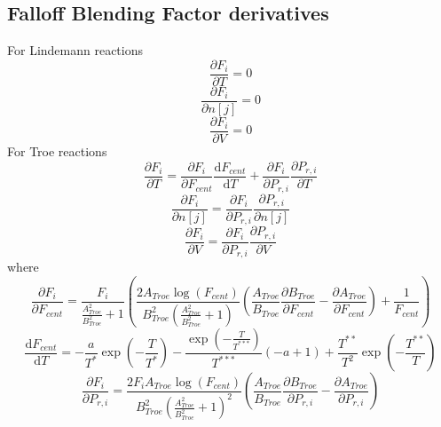 \documentclass[a4paper,10pt]{article}
\begin{document}
\subsection{Falloff Blending Factor derivatives}

 For Lindemann reactions
\begin{dmath} \frac{\partial F_{i} }{\partial T } = 0\end{dmath} 
\begin{dmath} \frac{\partial F_{i} }{\partial n[j] } = 0\end{dmath} 
\begin{dmath} \frac{\partial F_{i} }{\partial V } = 0\end{dmath} 
For Troe reactions
\begin{dmath} \frac{\partial F_{i} }{\partial T } = \frac{\partial F_{i} }{\partial F_{cent} } \frac{\text{d} F_{cent} }{\text{d} T } + \frac{\partial F_{i} }{\partial P_{r, i} } \frac{\partial P_{r, i} }{\partial T }\end{dmath} 
\begin{dmath} \frac{\partial F_{i} }{\partial n[j] } = \frac{\partial F_{i} }{\partial P_{r, i} } \frac{\partial P_{r, i} }{\partial n[j] }\end{dmath} 
\begin{dmath} \frac{\partial F_{i} }{\partial V } = \frac{\partial F_{i} }{\partial P_{r, i} } \frac{\partial P_{r, i} }{\partial V }\end{dmath} 
where
\begin{dmath} \frac{\partial F_{i} }{\partial F_{cent} } = \frac{F_{i}}{\frac{A_{Troe}^{2}}{B_{Troe}^{2}} + 1} \left(\frac{2 A_{Troe} \log{\left (F_{cent} \right )}}{B_{Troe}^{2} \left(\frac{A_{Troe}^{2}}{B_{Troe}^{2}} + 1\right)} \left(\frac{A_{Troe}}{B_{Troe}} \frac{\partial B_{Troe} }{\partial F_{cent} } - \frac{\partial A_{Troe} }{\partial F_{cent} }\right) + \frac{1}{F_{cent}}\right)\end{dmath} 
\begin{dmath} \frac{\text{d} F_{cent} }{\text{d} T } = - \frac{a}{T^{*}} \operatorname{exp}\left({- \frac{T}{T^{*}}}\right) - \frac{\operatorname{exp}\left({- \frac{T}{T^{***}}}\right)}{T^{***}} \left(- a + 1\right) + \frac{T^{**}}{T^{2}} \operatorname{exp}\left({- \frac{T^{**}}{T}}\right)\end{dmath} 
\begin{dmath} \frac{\partial F_{i} }{\partial P_{r, i} } = \frac{2 F_{i} A_{Troe} \log{\left (F_{cent} \right )}}{B_{Troe}^{2} \left(\frac{A_{Troe}^{2}}{B_{Troe}^{2}} + 1\right)^{2}} \left(\frac{A_{Troe}}{B_{Troe}} \frac{\partial B_{Troe} }{\partial P_{r, i} } - \frac{\partial A_{Troe} }{\partial P_{r, i} }\right)\end{dmath} 
\end{document}
